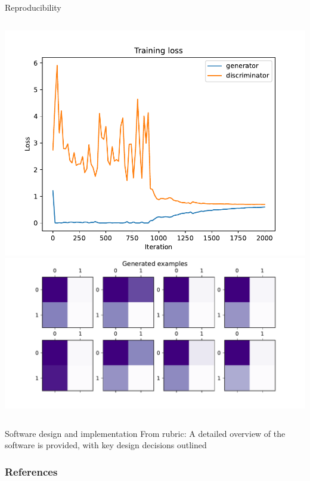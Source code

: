\documentclass{beamer}
\begin{document}
\begin{frame}{Reproducibility}
\begin{columns}
\centering
    \includegraphics[width=\linewidth]{figures/training_loss_2.pdf}
    \includegraphics[width=\linewidth]{figures/examples_2.pdf}
\end{columns}

\end{frame}

\begin{frame}{Software design and implementation}
From rubric: A detailed overview of the software is provided, with key design decisions outlined
\end{frame}

\begin{frame}[allowframebreaks]
  \frametitle{References}
  \printbibliography
\end{frame}
\end{document}
